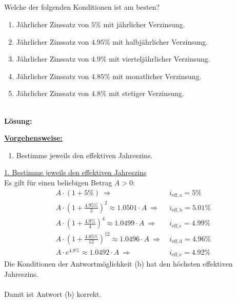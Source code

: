 \subsection*{}
Welche der folgenden Konditionen ist am besten?
\renewcommand{\labelenumi}{(\alph{enumi})}
\begin{enumerate}
	\item 
	Jährlicher Zinssatz von $5 \%$ mit jährlicher Verzinsung.
	\item
	Jährlicher Zinssatz von $4.95 \%$ mit halbjährlicher Verzinsung.
	\item
	Jährlicher Zinssatz von $4.9 \%$ mit vierteljährlicher Verzinsung.
	\item
	Jährlicher Zinssatz von $4.85 \%$ mit monatlicher Verzinsung.
	\item
	Jährlicher Zinssatz von $4.8 \%$ mit stetiger Verzinsung.	
\end{enumerate}
\ \\
\textbf{Lösung:}
\begin{mdframed}
\underline{\textbf{Vorgehensweise:}}
\renewcommand{\labelenumi}{\theenumi.}
\begin{enumerate}
\item Bestimme jeweils den effektiven Jahreszins.
\end{enumerate}
\end{mdframed}

\underline{1. Bestimme jeweils den effektiven Jahreszins}\\
Es gilt für einen beliebigen Betrag $A  > 0$:
\begin{align*}
	A \cdot 
	\left(
	1 + 5 \%
	\right)
	\ \Rightarrow \ &i_{\mathrm{eff,a}} = 5  \% \\
	A \cdot 
	\left(
	1 + \frac{4.95 \%}{2}
	\right)^2
	\approx 1.0501 \cdot A
	\ \Rightarrow \ &i_{\mathrm{eff,b}} = 5.01  \% \\
	A \cdot 
	\left(
	1 + \frac{4.9 \% }{4} 
	\right)^4
	\approx 1.0499 \cdot A
	\ \Rightarrow \ &i_{\mathrm{eff,c}} = 4.99  \% \\
	A \cdot 
	\left(
	1 + \frac{4.85 \%}{12} 
	\right)^12
	\approx 1.0496 \cdot A
	\ \Rightarrow \ &i_{\mathrm{eff,d}} = 4.96  \% \\
	A \cdot 
	e^{4.8 \% }
	\approx 1.0492 \cdot A
	\ \Rightarrow \ &i_{\mathrm{eff,e}} = 4.92  \% 
\end{align*}
Die Konditionen der Antwortmöglichkeit (b) hat den höchsten effektiven Jahreszins.\\
\\
Damit ist Antwort (b) korrekt.



